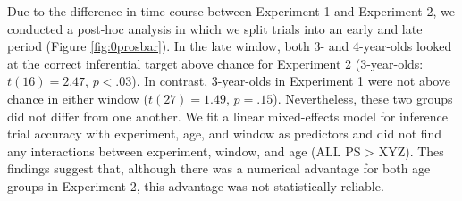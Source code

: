 \documentclass[10pt,letterpaper]{article}
\begin{document}


Due to the difference in time course between Experiment 1 and Experiment 2, we conducted a post-hoc analysis in which we split trials into an early and late period (Figure \ref{fig:0prosbar}). In the late window, both 3- and 4-year-olds looked at the correct inferential target above chance for Experiment 2 (3-year-olds: $t(16) = 2.47$, $p < .03$). In contrast, 3-year-olds in Experiment 1 were not above chance in either window ($t(27) = 1.49$, $p = .15$). Nevertheless, these two groups did not differ from one another. We fit a linear mixed-effects model for inference trial accuracy with experiment, age, and window as predictors and did not find any interactions between experiment, window, and age (ALL PS > XYZ). Thes findings suggest that, although there was a numerical advantage for both age groups in Experiment 2, this advantage was not statistically reliable. 
\end{document}
